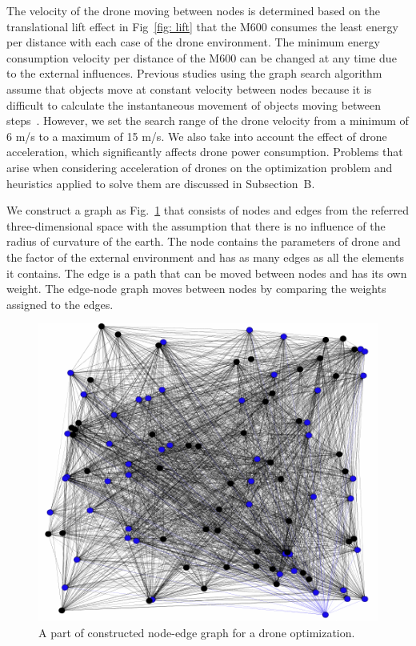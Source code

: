 \documentclass[journal]{./template/IEEEtran}
\begin{document}
The velocity of the drone moving between nodes is determined based on the translational lift effect in Fig~\ref{fig: lift} that the M600 consumes the least energy per distance with each case of the drone environment. 
The minimum energy consumption velocity per distance of the M600 can be changed at any time due to the external influences.  
Previous studies using the graph search algorithm assume that objects move at constant velocity between nodes because it is difficult to calculate the instantaneous movement of objects moving between steps~\cite{ref_8, ref_10, ref_22}. 
However, we set the search range of the drone velocity from a minimum of 6 m/s to a maximum of 15 m/s. We also take into account the effect of drone acceleration, which significantly affects drone power consumption.
Problems that arise when considering acceleration of drones on the optimization problem and heuristics applied to solve them are discussed in Subsection~B.

We construct a graph as Fig.~\ref{fig:node_graph} that consists of nodes and edges from the referred three-dimensional space with the assumption that there is no influence of the radius of curvature of the earth.
The node contains the parameters of drone and the factor of the external environment and has as many edges as all the elements it contains. 
The edge is a path that can be moved between nodes and has its own weight. The edge-node graph moves between nodes by comparing the weights assigned to the edges.  

\begin{figure}[htbp]
\centering\includegraphics[scale=0.85]{fig12/Node_graph.pdf}
\caption{A part of constructed node-edge graph for a drone optimization.}
\label{fig:node_graph}
\end{figure}
\end{document}

